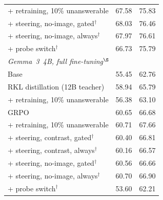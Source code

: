 \documentclass[10pt,twocolumn,letterpaper]{article}
\begin{document}
\begin{table}[t]
\begin{tabular}{lcc}
\quad + retraining, 10\% unanswerable        & 67.58 & 75.83 \\
\quad + steering, no-image, gated$^\dagger$  & 68.03 & 76.46 \\
\quad + steering, no-image, always$^\dagger$ & 67.97 & 76.61 \\
\quad + probe switch$^\dagger$               & 66.73 & 75.79 \\
\midrule
\multicolumn{3}{l}{\textit{Gemma~3~4B, full fine-tuning$^\S$}} \\
Base                                         & 55.45 & 62.76 \\
RKL distillation (12B teacher)               & 58.94 & 65.79 \\
\quad + retraining, 10\% unanswerable        & 56.38 & 63.10 \\
GRPO                                         & 60.65 & 66.68 \\
\quad + retraining, 10\% unanswerable        & 60.71 & 67.66 \\
\quad + steering, contrast, gated$^\dagger$  & 60.40 & 66.81 \\
\quad + steering, contrast, always$^\dagger$ & 60.16 & 66.57 \\
\quad + steering, no-image, gated$^\dagger$  & 60.56 & 66.66 \\
\quad + steering, no-image, always$^\dagger$ & 60.70 & 66.90 \\
\quad + probe switch$^\dagger$               & 53.60 & 62.21 \\
\bottomrule
\end{tabular}
\end{table}
\end{document}
